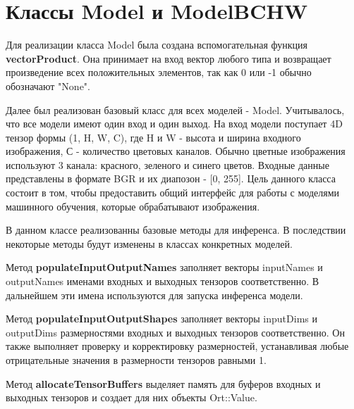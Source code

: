 \documentclass[a4paper,14pt]{extreport}
\begin{document}
        \section{Классы Model и ModelBCHW}
        Для реализации класса Model была создана вспомогательная функция \textbf{vectorProduct}. Она принимает на вход вектор любого типа и возвращает произведение всех положительных элементов, так как 0 или -1 обычно обозначают "None".
        
        
        Далее был реализован базовый класс для всех моделей - Model. Учитывалось, что все модели имеют один вход и один выход. На вход модели поступает 4D тензор формы (1, H, W, C), где H и W - высота и ширина входного изображения, С - количество цветовых каналов. Обычно цветные изображения используют 3 канала: красного, зеленого и синего цветов. Входные данные представлены в формате BGR и их диапозон - [0, 255]. Цель данного класса состоит в том, чтобы предоставить общий интерфейс для работы с моделями машинного обучения, которые обрабатывают изображения. 
        

        В данном классе реализованны базовые методы для инференса. В последствии некоторые методы будут изменены в классах конкретных моделей.

        Метод \hypertarget{populateNames}{}\textbf{populateInputOutputNames} заполняет векторы inputNames и outputNames именами входных и выходных тензоров соответственно. В дальнейшем эти имена используются для запуска инференса модели.
        

        Метод \hypertarget{populateShapes}{}\textbf{populateInputOutputShapes} заполняет векторы inputDims и outputDims размерностями входных и выходных тензоров соответственно. Он также выполняет проверку и корректировку размерностей, устанавливая любые отрицательные значения в размерности тензоров равными 1.
        

        Метод \hypertarget{allocate}{}\textbf{allocateTensorBuffers} выделяет память для буферов входных и выходных тензоров и создает для них объекты Ort::Value.
        
\end{document}
